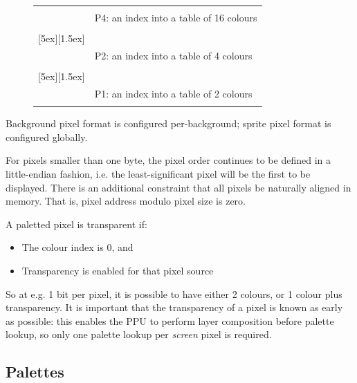 \documentclass[notitlepage]{article}
\begin{document}
\begin{figure}[!htb]
\begin{tabular}{r l}
{\begin{bytefield}[endianness=big,bitformatting=\small, bitwidth=auto]{4}
		\bitheader{0,3} \\
		\bitbox{4}{Index}
		\end{bytefield}} & P4: an index into a table of 16 colours \\
		\\
	\raisebox{-1ex}[5ex][1.5ex]{
		\begin{bytefield}[endianness=big,bitformatting=\small, bitwidth=auto]{2}
		\bitheader{0,1} \\
		\bitbox{2}{Idx}
		\end{bytefield}} & P2: an index into a table of 4 colours \\
		\\
	\raisebox{-1ex}[5ex][1.5ex]{
		\begin{bytefield}[endianness=big,bitformatting=\small, bitwidth=auto]{1}
		\bitheader{0} \\
		\bitbox{1}{I}
		\end{bytefield}} & P1: an index into a table of 2 colours \\
		\\
\end{tabular}
\end{figure}

Background pixel format is configured per-background; sprite pixel format is configured globally.

For pixels smaller than one byte, the pixel order continues to be defined in a little-endian fashion, i.e. the least-significant pixel will be the first to be displayed. There is an additional constraint that all pixels be naturally aligned in memory. That is, pixel address modulo pixel size is zero.

A paletted pixel is transparent if:

\begin{itemize}
	\item The colour index is 0, and
	\item Transparency is enabled for that pixel source
\end{itemize}

So at e.g. 1 bit per pixel, it is possible to have either 2 colours, or 1 colour plus transparency. It is important that the transparency of a pixel is known as early as possible: this enables the PPU to perform layer composition before palette lookup, so only one palette lookup per {\it screen} pixel is required.


\subsection{Palettes}
\end{document}
